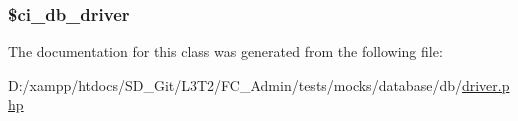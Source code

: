 \subsubsection[{\$ci\+\_\+db\+\_\+driver}]{\setlength{\rightskip}{0pt plus 5cm}\$ci\+\_\+db\+\_\+driver\hspace{0.3cm}{\ttfamily [protected]}}\label{class_mock___database___d_b___driver_aebf487ba6f39ae3b9bf272a78ae3f069}


The documentation for this class was generated from the following file\+:\begin{DoxyCompactItemize}
\item 
D\+:/xampp/htdocs/\+S\+D\+\_\+\+Git/\+L3\+T2/\+F\+C\+\_\+\+Admin/tests/mocks/database/db/\hyperlink{tests_2mocks_2database_2db_2_driver_8php}{driver.\+php}\end{DoxyCompactItemize}

